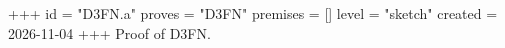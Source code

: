 +++
id = "D3FN.a"
proves = "D3FN"
premises = []
level = "sketch"
created = 2026-11-04
+++
Proof of D3FN.
